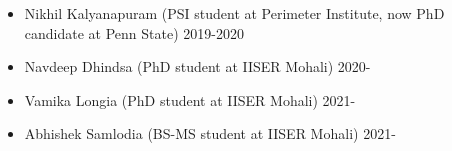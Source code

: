 \begin{itemize}
\vspace{1mm} 
  \item  Nikhil Kalyanapuram (PSI student at Perimeter Institute, now PhD candidate at Penn State) \hfill  2019-2020 
  \item  Navdeep Dhindsa (PhD student at IISER Mohali) \hfill 2020- 
  \item  Vamika Longia (PhD student at IISER Mohali) \hfill 2021- 
  \item  Abhishek Samlodia (BS-MS student at IISER Mohali) \hfill 2021- 
  \end{itemize}
